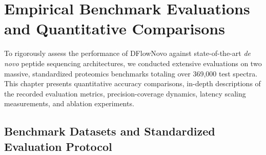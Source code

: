 \chapter{Empirical Benchmark Evaluations and Quantitative Comparisons}\label{chap:benchmarks}

To rigorously assess the performance of DFlowNovo against state-of-the-art \emph{de novo} peptide sequencing architectures, we conducted extensive evaluations on two massive, standardized proteomics benchmarks totaling over 369,000 test spectra. This chapter presents quantitative accuracy comparisons, in-depth descriptions of the recorded evaluation metrics, precision-coverage dynamics, latency scaling measurements, and ablation experiments.

\section{Benchmark Datasets and Standardized Evaluation Protocol}


